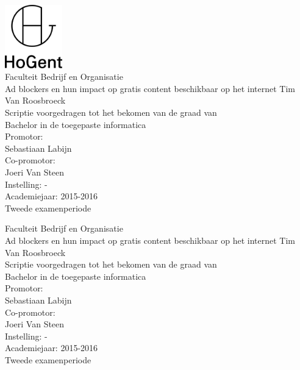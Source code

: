 \documentclass[pdftex,a4paper,12pt,twoside]{report}
\newcommand{\emptypage}{
\newpage
\thispagestyle{empty}
\mbox{}
\newpage
}
\newcommand{\student}{Tim Van Roosbroeck}
\newcommand{\promotor}{Sebastiaan Labijn}
\newcommand{\copromotor}{Joeri Van Steen}
\newcommand{\instelling}{-}
\newcommand{\titel}{Ad blockers en hun impact op gratis content beschikbaar op het internet}
\newcommand{\faculteit}{Faculteit Bedrijf en Organisatie}
\newcommand{\rapporttype}{Scriptie voorgedragen tot het bekomen van de graad van\\Bachelor in de toegepaste informatica}
\newcommand{\academiejaar}{2015-2016}
\newcommand{\examenperiode}{Tweede examenperiode}
\begin{document}

\begin{titlepage}
  \begin{center}

    \begingroup
    \rmfamily
    \includegraphics[width=2.5cm]{img/HG-beeldmerk-woordmerk}\\[.5cm]
    \faculteit\\[3cm]
    \titel
    \vfill
    \student\\[3.5cm]
    \rapporttype\\[2cm]
    Promotor:\\
    \promotor\\
    Co-promotor:\\
    \copromotor\\[2.5cm]
    Instelling: \instelling\\[.5cm]
    Academiejaar: \academiejaar\\[.5cm]
    \examenperiode
    \endgroup

  \end{center}
  \restoregeometry
\end{titlepage}



\emptypage


\begin{titlepage}
  \begin{center}

    \begingroup
    \rmfamily
    \faculteit\\[3cm]
    \titel
    \vfill
    \student\\[3.5cm]
    \rapporttype\\[2cm]
    Promotor:\\
    \promotor\\
    Co-promotor:\\
    \copromotor\\[2.5cm]
    Instelling: \instelling\\[.5cm]
    Academiejaar: \academiejaar\\[.5cm]
    \examenperiode
    \endgroup

  \end{center}
  \restoregeometry
\end{titlepage}
\end{document}
